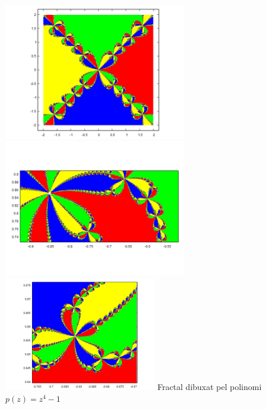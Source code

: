 \documentclass[12pt]{report}
\begin{document}
\begin{center}
    \includegraphics[width=0.6\textwidth]{z4_noZ.png}
    \newline
    \includegraphics[width=0.6\textwidth]{z4.png}
    \newline
    \includegraphics[width=0.5\textwidth]{z4_zoom2.png}
    \newline
\hspace{-6em}Fractal dibuxat pel polinomi $p(z)=z^4-1$
\label{fig:prodcte arrels}
\end{center}
\newpage
\end{document}
